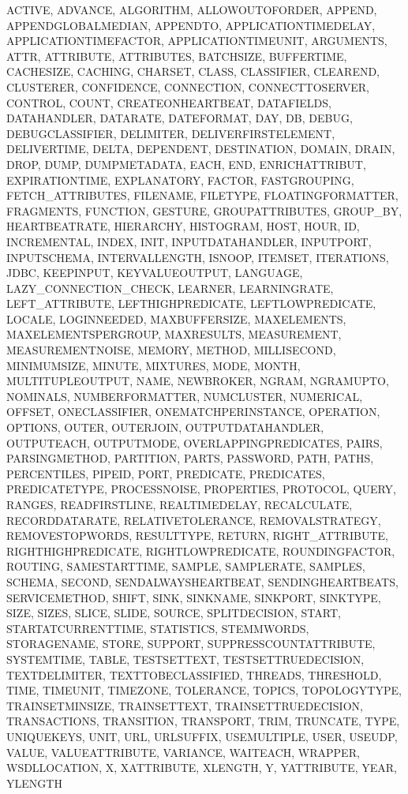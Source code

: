 {{ACTIVE, ADVANCE, ALGORITHM, ALLOWOUTOFORDER, APPEND, APPENDGLOBALMEDIAN, APPENDTO, APPLICATIONTIMEDELAY, APPLICATIONTIMEFACTOR, APPLICATIONTIMEUNIT, ARGUMENTS, ATTR, ATTRIBUTE, ATTRIBUTES, BATCHSIZE, BUFFERTIME, CACHESIZE, CACHING, CHARSET, CLASS, CLASSIFIER, CLEAREND, CLUSTERER, CONFIDENCE, CONNECTION, CONNECTTOSERVER, CONTROL, COUNT, CREATEONHEARTBEAT, DATAFIELDS, DATAHANDLER, DATARATE, DATEFORMAT, DAY, DB, DEBUG, DEBUGCLASSIFIER, DELIMITER, DELIVERFIRSTELEMENT, DELIVERTIME, DELTA, DEPENDENT, DESTINATION, DOMAIN, DRAIN, DROP, DUMP, DUMPMETADATA, EACH, END, ENRICHATTRIBUT, EXPIRATIONTIME, EXPLANATORY, FACTOR, FASTGROUPING, FETCH_ATTRIBUTES, FILENAME, FILETYPE, FLOATINGFORMATTER, FRAGMENTS, FUNCTION, GESTURE, GROUPATTRIBUTES, GROUP_BY, HEARTBEATRATE, HIERARCHY, HISTOGRAM, HOST, HOUR, ID, INCREMENTAL, INDEX, INIT, INPUTDATAHANDLER, INPUTPORT, INPUTSCHEMA, INTERVALLENGTH, ISNOOP, ITEMSET, ITERATIONS, JDBC, KEEPINPUT, KEYVALUEOUTPUT, LANGUAGE, LAZY_CONNECTION_CHECK, LEARNER, LEARNINGRATE, LEFT_ATTRIBUTE, LEFTHIGHPREDICATE, LEFTLOWPREDICATE, LOCALE, LOGINNEEDED, MAXBUFFERSIZE, MAXELEMENTS, MAXELEMENTSPERGROUP, MAXRESULTS, MEASUREMENT, MEASUREMENTNOISE, MEMORY, METHOD, MILLISECOND, MINIMUMSIZE, MINUTE, MIXTURES, MODE, MONTH, MULTITUPLEOUTPUT, NAME, NEWBROKER, NGRAM, NGRAMUPTO, NOMINALS, NUMBERFORMATTER, NUMCLUSTER, NUMERICAL, OFFSET, ONECLASSIFIER, ONEMATCHPERINSTANCE, OPERATION, OPTIONS, OUTER, OUTERJOIN, OUTPUTDATAHANDLER, OUTPUTEACH, OUTPUTMODE, OVERLAPPINGPREDICATES, PAIRS, PARSINGMETHOD, PARTITION, PARTS, PASSWORD, PATH, PATHS, PERCENTILES, PIPEID, PORT, PREDICATE, PREDICATES, PREDICATETYPE, PROCESSNOISE, PROPERTIES, PROTOCOL, QUERY, RANGES, READFIRSTLINE, REALTIMEDELAY, RECALCULATE, RECORDDATARATE, RELATIVETOLERANCE, REMOVALSTRATEGY, REMOVESTOPWORDS, RESULTTYPE, RETURN, RIGHT_ATTRIBUTE, RIGHTHIGHPREDICATE, RIGHTLOWPREDICATE, ROUNDINGFACTOR, ROUTING, SAMESTARTTIME, SAMPLE, SAMPLERATE, SAMPLES, SCHEMA, SECOND, SENDALWAYSHEARTBEAT, SENDINGHEARTBEATS, SERVICEMETHOD, SHIFT, SINK, SINKNAME, SINKPORT, SINKTYPE, SIZE, SIZES, SLICE, SLIDE, SOURCE, SPLITDECISION, START, STARTATCURRENTTIME, STATISTICS, STEMMWORDS, STORAGENAME, STORE, SUPPORT, SUPPRESSCOUNTATTRIBUTE, SYSTEMTIME, TABLE, TESTSETTEXT, TESTSETTRUEDECISION, TEXTDELIMITER, TEXTTOBECLASSIFIED, THREADS, THRESHOLD, TIME, TIMEUNIT, TIMEZONE, TOLERANCE, TOPICS, TOPOLOGYTYPE, TRAINSETMINSIZE, TRAINSETTEXT, TRAINSETTRUEDECISION, TRANSACTIONS, TRANSITION, TRANSPORT, TRIM, TRUNCATE, TYPE, UNIQUEKEYS, UNIT, URL, URLSUFFIX, USEMULTIPLE, USER, USEUDP, VALUE, VALUEATTRIBUTE, VARIANCE, WAITEACH, WRAPPER, WSDLLOCATION, X, XATTRIBUTE, XLENGTH, Y, YATTRIBUTE, YEAR, YLENGTH%
}}
